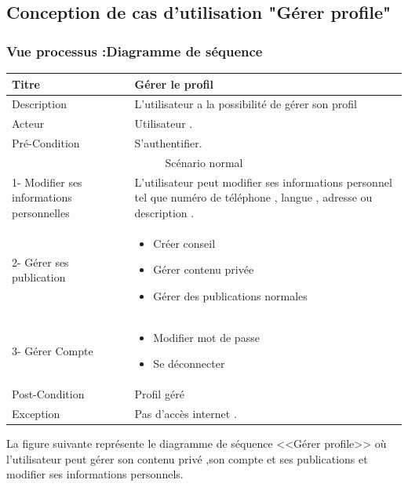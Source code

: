 \documentclass[11pt,a4paper,oneside]{book}
\begin{document}
			\subsection{Conception de cas d’utilisation "Gérer profile"}
			\subsubsection{Vue processus :Diagramme de séquence}
			\begin{tabular}{ |p{3cm}|p{8cm}|  }
				
				\hline
				Titre& Gérer le profil \\
				\hline
				Description  & L’utilisateur a la possibilité de gérer son profil\\
				\hline
				Acteur&Utilisateur .\\
				\hline
				Pré-Condition &S’authentifier.
				\\
				\hline
				\multicolumn{2}{|c|}{Scénario normal} \\
				\hline
				1- Modifier ses informations personnelles & L’utilisateur peut modifier ses informations personnel tel que numéro de téléphone , langue , adresse ou description .\\
				
				2- Gérer ses publication & 
				\begin{itemize} 
					\item Créer conseil 
					\item Gérer contenu privée
					\item Gérer des publications normales 
					\end {itemize} \\
					3- Gérer Compte&
					\begin{itemize}
						\item Modifier mot de passe 
						\item Se déconnecter
					\end{itemize}\\
					\hline
					Post-Condition& Profil géré\\
					\hline
					Exception&  Pas d’accès internet .\\
					\hline
					
				\end{tabular}
				
				La figure suivante représente le diagramme de séquence <<Gérer profile>>  où l’utilisateur peut gérer son contenu privé ,son compte et ses publications et modifier ses informations personnels.
				
\end{document}
